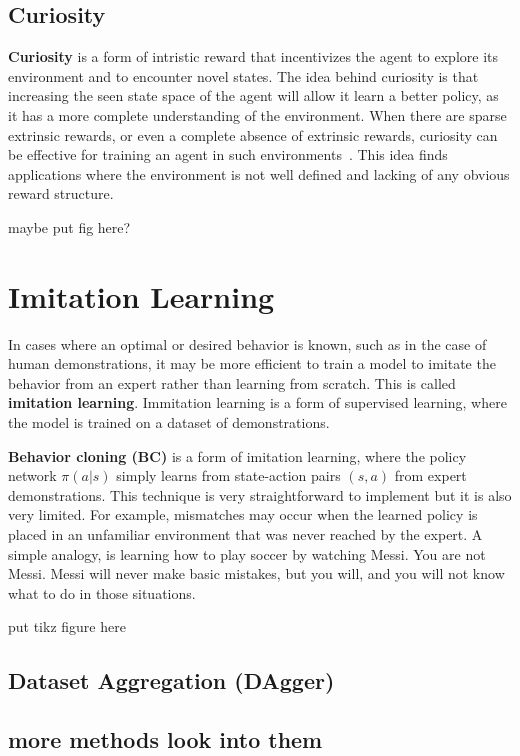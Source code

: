 \documentclass[12pt]{report}
\theoremstyle{definition}
\theoremstyle{remark}
\begin{document}
\subsection{Curiosity}
\textbf{Curiosity} is a form of intristic reward that incentivizes the agent to explore its environment and to encounter novel states. The idea behind curiosity is that increasing the seen state space of the agent will allow it learn a better policy, as it has a more complete understanding of the environment. When there are sparse extrinsic rewards, or even a complete absence of extrinsic rewards, curiosity can be effective for training an agent in such environments~\cite{pathak_curiosity-driven_2017}. This idea finds applications where the environment is not well defined and lacking of any obvious reward structure.

maybe put fig here?

\section{Imitation Learning}
In cases where an optimal or desired behavior is known, such as in the case of human demonstrations, it may be more efficient to train a model to imitate the behavior from an expert rather than learning from scratch. This is called \textbf{imitation learning}. Immitation learning is a form of supervised learning, where the model is trained on a dataset of demonstrations.

\textbf{Behavior cloning (BC)} is a form of imitation learning, where the policy network $\pi(a|s)$ simply learns from state-action pairs $(s, a)$ from expert demonstrations. This technique is very straightforward to implement but it is also very limited. For example, mismatches may occur when the learned policy is placed in an unfamiliar environment that was never reached by the expert. A simple analogy, is learning how to play soccer by watching Messi. You are not Messi. Messi will never make basic mistakes, but you will, and you will not know what to do in those situations.

put tikz figure here


\subsection{Dataset Aggregation (DAgger)}

\subsection{more methods look into them}
\end{document}
